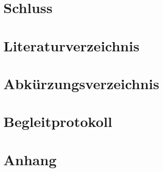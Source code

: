 \chapter{Schluss}
\label{chap:con}

\pagebreak

\chapter{Literaturverzeichnis}
\pagebreak
\printbibliography[heading=none]
\listoffigures
\pagebreak

\chapter{Abkürzungsverzeichnis}
\pagebreak

\chapter{Begleitprotokoll}

\chapter{Anhang}\Blindtext[2]
